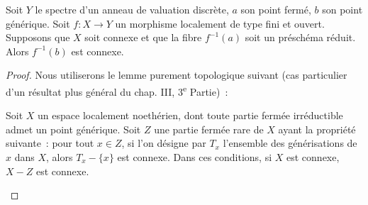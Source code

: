 \begin{lemma}[15.5.6]
\label{IV.15.5.6-fr}
Soit $Y$ le spectre d'un anneau de valuation discrète, $a$ son point fermé, $b$ son point générique. Soit $f:X\to Y$ un morphisme localement de type fini et ouvert. Supposons que $X$ soit connexe et que la fibre $f^{-1}(a)$ soit un préschéma réduit. Alors $f^{-1}(b)$ est connexe.
\end{lemma}

\begin{proof}
Nous utiliserons le lemme purement topologique suivant (cas particulier d'un résultat plus général du chap. III, 3\textsuperscript{e} Partie)~:
\begin{lemma}[15.5.6.1]
\label{IV.15.5.6.1-fr}
Soit $X$ un espace localement noethérien, dont toute partie fermée irréductible admet un point générique. Soit $Z$ une partie fermée rare de $X$ ayant la propriété suivante~: pour tout $x\in Z$, si l'on désigne par $T_x$ l'ensemble des générisations de $x$ dans $X$, alors $T_x-\{x\}$ est connexe. Dans ces conditions, si $X$ est connexe, $X-Z$ est connexe.
\end{lemma}


\end{proof}
